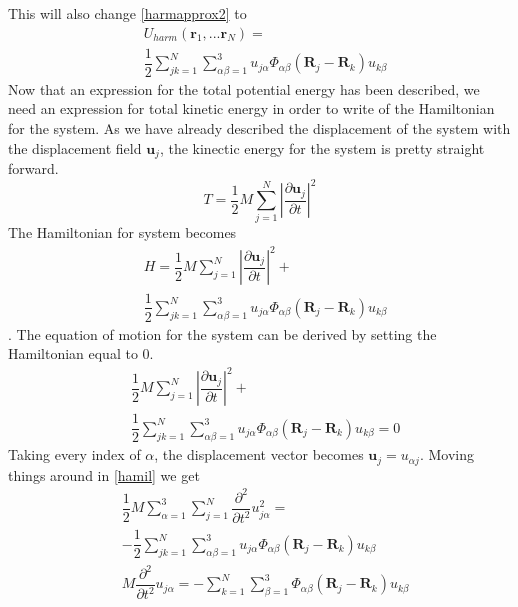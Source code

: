 \begin{equation}
\end{equation}This will also change \cref{harmapprox2} to\begin{align}
    &U_{harm}(\mathbf{r}_{1},...\mathbf{r}_{N})=\nonumber\\
    &\dfrac{1}{2}\sum_{jk=1}^{N}\sum_{\alpha\beta=1}^{3}u_{j\alpha}\Phi_{\alpha\beta}(\mathbf{R}_{j}-\mathbf{R}_{k})u_{k\beta}
\end{align}Now that an expression for the total potential energy has been described, we need an expression for total kinetic energy in order to write of the Hamiltonian for the system. As we have already described the displacement of the system with the displacement field $\mathbf{u}_{j}$, the kinectic energy for the system is pretty straight forward.\begin{equation}
    T=\dfrac{1}{2}M\sum_{j=1}^{N}\left|\dfrac{\partial\mathbf{u}_{j}}{\partial t}\right|^{2}
\end{equation}The Hamiltonian for system becomes\begin{align}
    & H=\dfrac{1}{2}M\sum_{j=1}^{N}\left|\dfrac{\partial\mathbf{u}_{j}}{\partial t}\right|^{2}+\nonumber\\
    & \dfrac{1}{2}\sum_{jk=1}^{N}\sum_{\alpha\beta=1}^{3}u_{j\alpha}\Phi_{\alpha\beta}(\mathbf{R}_{j}-\mathbf{R}_{k})u_{k\beta}
\end{align}. The equation of motion for the system can be derived by setting the Hamiltonian equal to 0.\begin{align}
    & \dfrac{1}{2}M\sum_{j=1}^{N}\left|\dfrac{\partial\mathbf{u}_{j}}{\partial t}\right|^{2}+\nonumber\\
    & \dfrac{1}{2}\sum_{jk=1}^{N}\sum_{\alpha\beta=1}^{3}u_{j\alpha}\Phi_{\alpha\beta}(\mathbf{R}_{j}-\mathbf{R}_{k})u_{k\beta}=0\label{hamil}
\end{align} Taking every index of $\alpha$, the displacement vector becomes $\mathbf{u}_{j}=u_{\alpha j}$. Moving things around in \cref{hamil} we get\begin{align}
     & \dfrac{1}{2}M\sum_{\alpha=1}^{3}\sum_{j=1}^{N}\dfrac{\partial^{2}}{\partial t^{2}}u_{j\alpha}^{2}=\nonumber\\
    & -\dfrac{1}{2}\sum_{jk=1}^{N}\sum_{\alpha\beta=1}^{3}u_{j\alpha}\Phi_{\alpha\beta}(\mathbf{R}_{j}-\mathbf{R}_{k})u_{k\beta}\nonumber\\
    & M\dfrac{\partial^{2}}{\partial t^{2}}u_{j\alpha}=-\sum_{k=1}^{N}\sum_{\beta=1}^{3}\Phi_{\alpha\beta}(\mathbf{R}_{j}-\mathbf{R}_{k})u_{k\beta}\label{Eqmotion}

\end{align}
